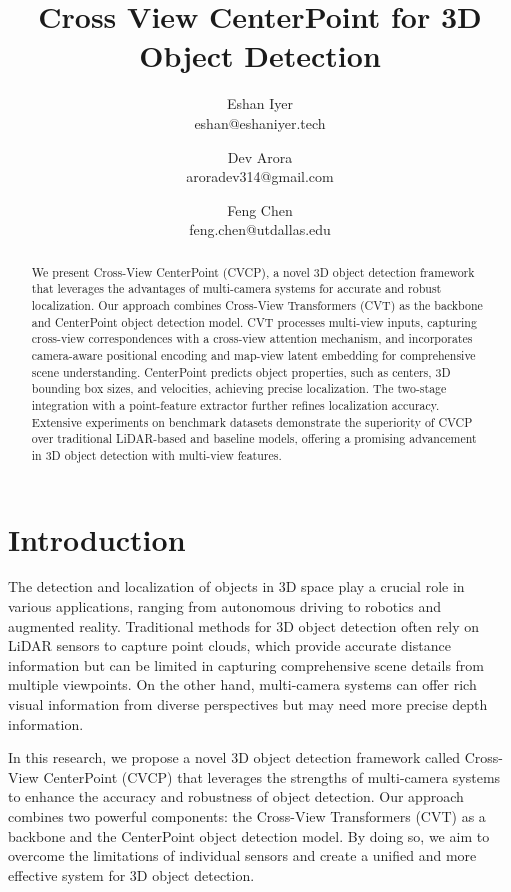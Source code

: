 \documentclass[times, report, parskip, openbib, twocolumn]{article}
\title{\textbf{Cross View CenterPoint for 3D Object Detection}}
\author{Eshan Iyer \\ eshan@eshaniyer.tech  \and Dev Arora \\ aroradev314@gmail.com \and Feng Chen \\feng.chen@utdallas.edu }
\date{}
\begin{document}
\maketitle

\begin{abstract}

    We present Cross-View CenterPoint (CVCP), a novel 3D object detection framework that leverages the advantages of multi-camera systems for accurate and robust localization. Our approach combines Cross-View Transformers (CVT) as the backbone and CenterPoint object detection model. CVT processes multi-view inputs, capturing cross-view correspondences with a cross-view attention mechanism, and incorporates camera-aware positional encoding and map-view latent embedding for comprehensive scene understanding. CenterPoint predicts object properties, such as centers, 3D bounding box sizes, and velocities, achieving precise localization. The two-stage integration with a point-feature extractor further refines localization accuracy. Extensive experiments on benchmark datasets demonstrate the superiority of CVCP over traditional LiDAR-based and baseline models, offering a promising advancement in 3D object detection with multi-view features.
    
\end{abstract}

\section{Introduction}

The detection and localization of objects in 3D space play a crucial role in various applications, ranging from autonomous driving to robotics and augmented reality. Traditional methods for 3D object detection often rely on LiDAR sensors to capture point clouds, which provide accurate distance information but can be limited in capturing comprehensive scene details from multiple viewpoints. On the other hand, multi-camera systems can offer rich visual information from diverse perspectives but may need more precise depth information.

In this research, we propose a novel 3D object detection framework called Cross-View CenterPoint (CVCP) that leverages the strengths of multi-camera systems to enhance the accuracy and robustness of object detection. Our approach combines two powerful components: the Cross-View Transformers (CVT) as a backbone and the CenterPoint object detection model. By doing so, we aim to overcome the limitations of individual sensors and create a unified and more effective system for 3D object detection.
\end{document}
